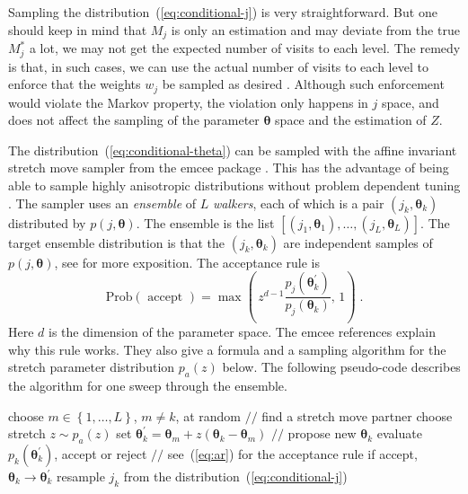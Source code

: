 \documentclass[letterpaper, preprint]{aastex}
\newcommand{\bth} {\boldsymbol \theta}
\begin{document}
Sampling the distribution~(\ref{eq:conditional-j}) is very straightforward. But one should keep in mind that $M_j$ is only an estimation and may deviate from the true $M^*_j$ a lot, we may not get the expected number of visits to each level. The remedy is that, in such cases, we can use the actual number of visits to each level to enforce that the weights $w_j$ be sampled as desired \citep{brewer11a}. Although such enforcement would violate the Markov property, the violation only happens in $j$ space, and does not affect the sampling of the parameter $\bth$ space and the estimation of $Z$.

The distribution~(\ref{eq:conditional-theta}) can be sampled with the affine invariant stretch move sampler from the emcee package \citep{foreman-mackey13a}. This has the advantage of being able to sample highly anisotropic distributions without problem dependent tuning \citep{hou12a}. The sampler uses an {\em ensemble} of $L$ {\em walkers}, each of which is a pair $(j_k,\bth_k)$ distributed by $p(j,\bth)$. The ensemble is the list $[(j_1,\bth_1), \ldots, (j_L,\bth_L)]$. The target ensemble distribution is that the $(j_k,\bth_k)$ are independent samples of $p(j,\bth)$, see \citep{goodman10a} for more exposition. The acceptance rule is
\begin{equation}
\mbox{Prob}(\mbox{ accept }) 
= \max\left( \, z^{d-1} \frac{p_j(\bth_k^{\prime})}{p_j(\bth_k)},\, 1\right) \; .
\label{eq:ar}
\end{equation}
Here $d$ is the dimension of the parameter space. The emcee references explain why this rule works. They also give a formula and a sampling algorithm for the stretch parameter distribution $p_a(z)$ below. The following pseudo-code describes the algorithm for one sweep through the ensemble.
\begin{algorithmic}
   \State choose $m \in \left\{1,\ldots,L\right\}$, $m \neq k$, at random      
             \hspace{.4in} $\mbox{//}$ find a stretch move partner
   \State choose stretch $z \sim p_a(z)$
   \State set $\bth^{\prime}_k = \bth_m + z(\bth_k - \bth_m)$
              \hspace{1.45in} $\mbox{//}$ propose new $\bth_k$
   \State evaluate $p_{k}(\bth^{\prime}_k)$, accept or reject
              \hspace{1in} $\mbox{//}$ see~(\ref{eq:ar}) for the acceptance rule
   \State if accept, $\bth_k \rightarrow \bth_k^{\prime}$
   \State resample $j_k$ from the distribution~(\ref{eq:conditional-j})
\EndFor
\end{algorithmic}
\end{document}
